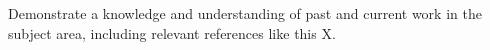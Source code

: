 Demonstrate a knowledge and understanding of past and current work in the subject area, including relevant references like this X.
